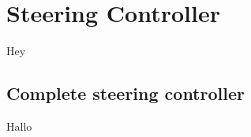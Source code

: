 \section{Steering Controller}\label{sec:steeringController}

Hey





\subsection{Complete steering controller}

Hallo